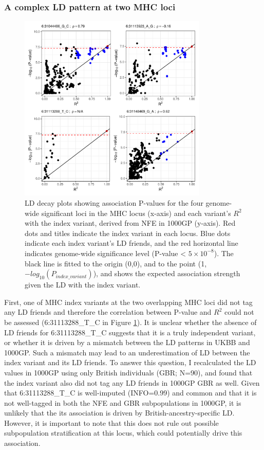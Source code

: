   \subsubsection{A complex LD pattern at two MHC loci}
  \begin{figure}[H] 
    \centering    
    \includegraphics[width=0.8\textwidth]{ukbb_ld_decay_mhc}
    \caption[LD decay plots for the pAD-associated MHC loci in the UKBB analysis]{LD decay plots showing association P-values for the four genome-wide significant loci in the MHC locus (x-axis) and each variant's $R^{2}$ with the index variant, derived from NFE in 1000GP (y-axis). Red dots and titles indicate the index variant in each locus. Blue dots indicate each index variant's LD friends, and the red horizontal line indicates genome-wide significance level (P-value < $5\times10^{-8}$). The black line is fitted to the origin (0,0), and to the point (1,$-log_{10}(P_{index\_variant})$), and shows the expected association strength given the LD with the index variant.}
    \label{fig:ukbb_ld_decay_mhc}
    \end{figure}
  First, one of MHC index variants at the two overlapping MHC loci did not tag any LD friends and therefore the correlation between P-value and $R^{2}$ could not be assessed (6:31113288\_T\_C in Figure \ref{fig:ukbb_ld_decay_mhc}). It is unclear whether the absence of LD friends for 6:31113288\_T\_C suggests that it is a truly independent variant, or whether it is driven by a mismatch between the LD patterns in UKBB and 1000GP. Such a mismatch may lead to an underestimation of LD between the index variant and its LD friends. To answer this question, I recalculated the LD values in 1000GP using only British individuals (GBR; N=90), and found that the index variant also did not tag any LD friends in 1000GP GBR as well. Given that 6:31113288\_T\_C is well-imputed (INFO=0.99) and common and that it is not well-tagged in both the NFE and GBR subpopulations in 1000GP, it is unlikely that the its association is driven by British-ancestry-specific LD. However, it is important to note that this does not rule out possible subpopulation stratification at this locus, which could potentially drive this association. 

